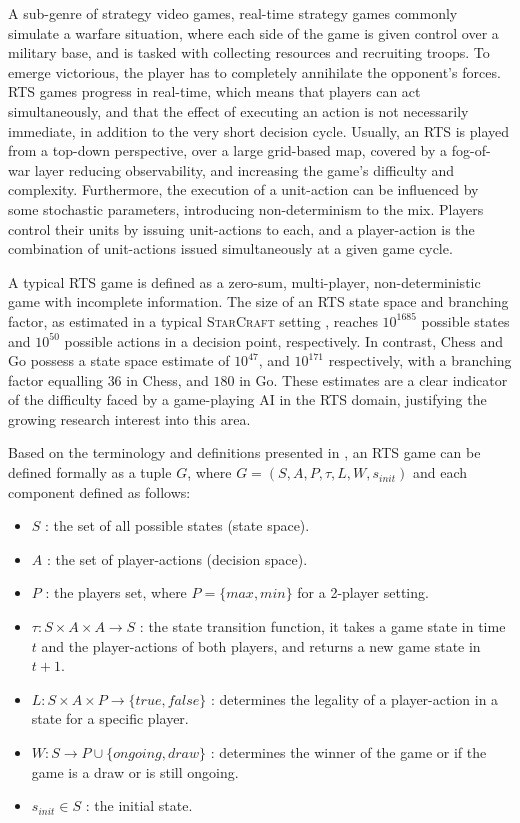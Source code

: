 \documentclass[conference]{IEEEtran}
\begin{document}
A sub-genre of strategy video games, real-time strategy games commonly simulate a warfare situation, where each side of the game is given control over a military base, and is tasked with collecting resources and recruiting troops.
 To emerge victorious, the player has to completely annihilate the opponent's forces. RTS games progress in real-time, which means that players can act simultaneously, and that the effect of executing an action is not necessarily immediate, in addition to the very short decision cycle. Usually, an RTS is played from a top-down perspective, over a large grid-based map, covered by a fog-of-war layer reducing observability, and increasing the game's difficulty and complexity. Furthermore, the execution of a unit-action can be influenced by some stochastic parameters,
 introducing non-determinism to the mix. Players control their units by issuing unit-actions to each, and a player-action is the combination of unit-actions issued simultaneously at a given game cycle.

A typical RTS game is defined as a zero-sum, multi-player, non-deterministic game with incomplete information. The size of an RTS state space and branching factor, as estimated in a typical \textsc{StarCraft} setting \cite{ontanon_survey_2013}, reaches $10^{1685}$ possible states and $10^{50}$ possible actions in a decision point, respectively. In contrast, Chess and Go possess a state space estimate of $10^{47}$, and $10^{171}$ respectively, with a branching factor equalling $36$ in Chess, and $180$ in Go. These estimates are a clear indicator of the difficulty faced by a game-playing AI in the RTS domain, justifying the growing research interest into this area.

Based on the terminology and definitions presented in \cite{ontanon_combinatorial_2017}, an RTS game can be defined formally as a tuple $G$, where $G = (S, A, P, \tau, L, W, s_{init})$ and each component defined as follows:

\begin{itemize}
\item $S$ : the set of all possible states (state space).
\item $A$ : the set of player-actions (decision space).
\item $P$ : the players set, where $P=\{max,min\}$ for a 2-player setting.
\item $\tau : S \times A \times A \rightarrow S$ : the state transition function, it takes a game state in time $t$ and the player-actions of both players, and returns a new game state in $t+1$.
\item $L: S \times A \times P \rightarrow \{true,false\}$ : determines the legality of a player-action in a state for a specific player.
\item $W: S \rightarrow P \cup \{ongoing,draw\}$ : determines the winner of the game or if the game is a draw or is still ongoing.
\item $s_{init} \in S$ : the initial state.
\end{itemize}
\end{document}
